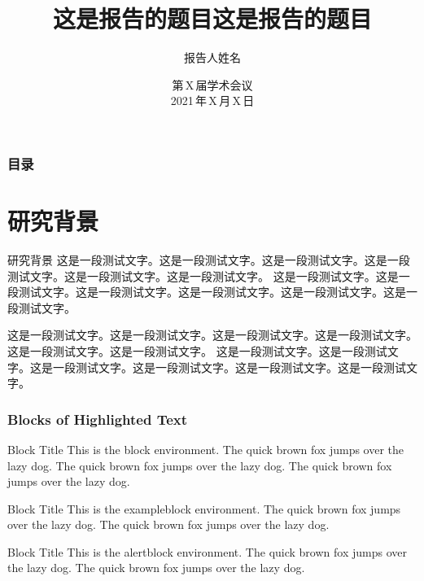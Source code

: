 \documentclass[notheorems,11pt,compress]{beamer}
\title[报告题目]{这是报告的题目这是报告的题目}
\author[姓名]{报告人姓名}
\institute[XX大学]{\vskip -10pt
\small \textcolor{blue}{XX\,大学数学系}
\vskip 10pt
}
\date[2021\,年\,X\,月\,X\,日]{第\,X\,届学术会议 \\[5pt] 2021\,年\,X\,月\,X\,日 }
\numberwithin{figure}{section}
\numberwithin{table}{section}
\numberwithin{equation}{section}
\theoremstyle{plain}
\numberwithin{theorem}{section}
\numberwithin{definition}{section}
\numberwithin{lemma}{section}
\numberwithin{proposition}{section}
\numberwithin{corollary}{section}
\theoremstyle{example}
\begin{document}
\setlength{\baselineskip}{15pt}


{
\begin{frame}
\titlepage %
\end{frame}}


\begin{frame}
\frametitle{目录}
\vskip -5.6pt
\hspace*{1.5em}
\parbox[t]{.95\textwidth}{
  \begin{minipage}[c][0.6\textheight]{\textwidth}
  \tableofcontents
  \end{minipage}
}
\end{frame}


\section{研究背景}

\begin{frame}{研究背景}
这是一段测试文字。这是一段测试文字。这是一段测试文字。这是一段测试文字。这是一段测试文字。这是一段测试文字。
这是一段测试文字。这是一段测试文字。这是一段测试文字。这是一段测试文字。这是一段测试文字。这是一段测试文字。

\vspace{1ex}
这是一段测试文字。这是一段测试文字。这是一段测试文字。这是一段测试文字。这是一段测试文字。这是一段测试文字。
这是一段测试文字。这是一段测试文字。这是一段测试文字。这是一段测试文字。这是一段测试文字。这是一段测试文字。

\end{frame}


\begin{frame}
\frametitle{Blocks of Highlighted Text}
\begin{block}{Block Title}
This is the block environment. The quick brown fox jumps over the lazy dog. The quick brown fox jumps over the lazy dog. The quick brown fox jumps over the lazy dog.
\end{block}

\begin{exampleblock}{Block Title}
This is the exampleblock environment. The quick brown fox jumps over the lazy dog. The quick brown fox jumps over the lazy dog.
\end{exampleblock}

\begin{alertblock}{Block Title}
This is the alertblock environment. The quick brown fox jumps over the lazy dog. The quick brown fox jumps over the lazy dog.
\end{alertblock}
\end{frame}
\end{document}
